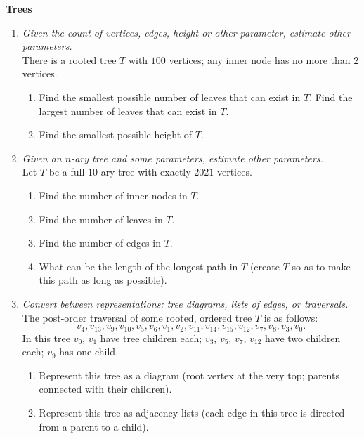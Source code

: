 \documentclass[a4paper,12pt]{article}
\begin{document}
\vspace{10pt}
{\bf Trees}


\begin{enumerate}
\item {\small \em  Given the count of vertices, edges, height or other parameter, estimate other parameters.}\\
There is a rooted tree $T$ with $100$ vertices; any inner node has no more than $2$ vertices.
\begin{enumerate}
\item Find the smallest possible number of leaves that can exist in $T$.
Find the largest number of leaves that can exist in $T$.
\item Find the smallest possible height of $T$.
\end{enumerate}

\item {\small \em  Given an $n$-ary tree and some parameters, estimate other parameters.}\\
Let $T$ be a full $10$-ary tree with exactly $2021$ vertices.
\begin{enumerate}
\item Find the number of inner nodes in $T$.
\item Find the number of leaves in $T$.
\item Find the number of edges in $T$.
\item What can be the length of the longest path in $T$ (create $T$ so as
to make this path as long as possible).
\end{enumerate}



\item {\small \em  Convert between representations: tree diagrams, lists of edges, or traversals.}\\
The post-order traversal of some rooted, ordered tree $T$ is as follows:
\[ v_{4}, v_{13}, v_{9}, v_{10}, v_{5}, v_{6}, v_{1}, v_{2}, v_{11}, v_{14},
v_{15}, v_{12}, v_{7}, v_{8}, v_{3}, v_{0}. \]
In this tree $v_0$, $v_1$ have tree children each; $v_3$, $v_5$, $v_7$, $v_{12}$ have
two children each; $v_{9}$ has one child.
\begin{enumerate}
\item Represent this tree as a diagram (root vertex at the very top; parents connected with
their children).
\item Represent this tree as adjacency lists (each edge in this tree is directed
from a parent to a child).
\end{enumerate}



\end{enumerate}
\end{document}
